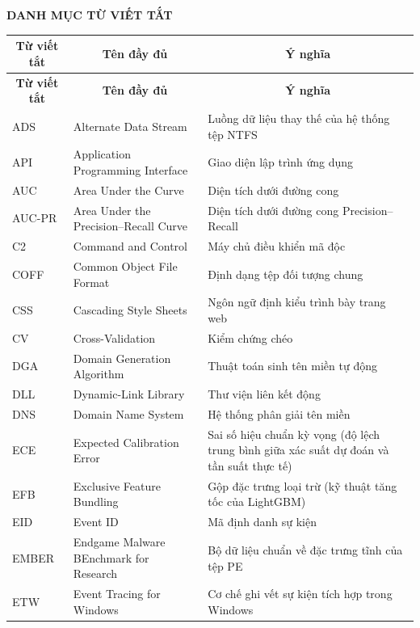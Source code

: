 \documentclass[../DoAn.tex]{subfiles}
\begin{document}
\begin{center}
    \Large{\textbf{DANH MỤC TỪ VIẾT TẮT}}\\
\end{center}
\vspace{0.5cm}

\begin{longtable}{|l|p{5.2cm}|p{6cm}|}
\hline
\multicolumn{1}{|c|}{\textbf{Từ viết tắt}} & \multicolumn{1}{c|}{\textbf{Tên đầy đủ}} & \multicolumn{1}{c|}{\textbf{Ý nghĩa}} \\
\hline
\endfirsthead
\hline
\multicolumn{1}{|c|}{\textbf{Từ viết tắt}} & \multicolumn{1}{c|}{\textbf{Tên đầy đủ}} & \multicolumn{1}{c|}{\textbf{Ý nghĩa}} \\
\hline
\endhead
\endfoot
\endlastfoot
ADS & Alternate Data Stream & Luồng dữ liệu thay thế của hệ thống tệp NTFS \\
\hline
API & Application Programming Interface & Giao diện lập trình ứng dụng \\
\hline
AUC & Area Under the Curve & Diện tích dưới đường cong \\
\hline
AUC-PR & Area Under the Precision--Recall Curve & Diện tích dưới đường cong Precision--Recall \\
\hline
C2 & Command and Control & Máy chủ điều khiển mã độc \\
\hline
COFF & Common Object File Format & Định dạng tệp đối tượng chung \\
\hline
CSS & Cascading Style Sheets & Ngôn ngữ định kiểu trình bày trang web \\
\hline
CV & Cross-Validation & Kiểm chứng chéo \\
\hline
DGA & Domain Generation Algorithm & Thuật toán sinh tên miền tự động \\
\hline
DLL & Dynamic-Link Library & Thư viện liên kết động \\
\hline
DNS & Domain Name System & Hệ thống phân giải tên miền \\
\hline
ECE & Expected Calibration Error & Sai số hiệu chuẩn kỳ vọng (độ lệch trung bình giữa xác suất dự đoán và tần suất thực tế) \\
\hline
EFB & Exclusive Feature Bundling & Gộp đặc trưng loại trừ (kỹ thuật tăng tốc của LightGBM) \\
\hline
EID & Event ID & Mã định danh sự kiện \\
\hline
EMBER & Endgame Malware BEnchmark for Research & Bộ dữ liệu chuẩn về đặc trưng tĩnh của tệp PE \\
\hline
ETW & Event Tracing for Windows & Cơ chế ghi vết sự kiện tích hợp trong Windows \\

\end{longtable}
\end{document}
